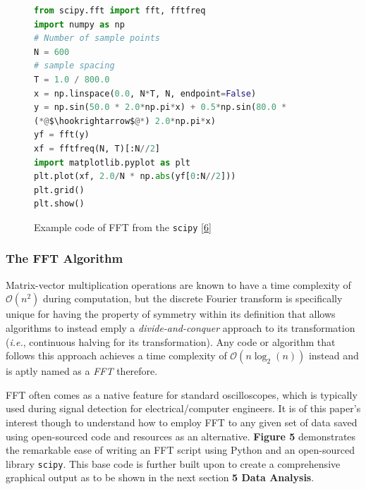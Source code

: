 \documentclass[12pt]{article}
\begin{document}
\begin{multicols}{2}
\begin{figure}[H]
    \begin{tcolorbox}[ %
        breakable, size=fbox, boxrule=1pt, pad at break*=1mm,colback=cellbackground, colframe=cellborder
    ]
        \begin{lstlisting}[language=Python] 
from scipy.fft import fft, fftfreq
import numpy as np
# Number of sample points
N = 600
# sample spacing
T = 1.0 / 800.0
x = np.linspace(0.0, N*T, N, endpoint=False)
y = np.sin(50.0 * 2.0*np.pi*x) + 0.5*np.sin(80.0 * 
(*@$\hookrightarrow$@*) 2.0*np.pi*x)
yf = fft(y)
xf = fftfreq(N, T)[:N//2]
import matplotlib.pyplot as plt
plt.plot(xf, 2.0/N * np.abs(yf[0:N//2]))
plt.grid()
plt.show()
        \end{lstlisting} %
    \end{tcolorbox}
    \caption{Example code of FFT from the \texttt{scipy} [\hyperref[sec:6]{6}]}
\end{figure}

\subsubsection{The FFT Algorithm}
Matrix-vector multiplication operations are known to have a time complexity of $\mathcal{O}(n^2)$ during computation,
but the discrete Fourier transform is specifically unique for having the property of symmetry within its definition that allows
algorithms to instead emply a \textit{divide-and-conquer} approach to its transformation (\textit{i.e.}, continuous halving for its transformation).
Any code or algorithm that follows this approach achieves a time complexity of $\mathcal{O}(n\log_2(n))$ instead and is aptly named as a \textit{FFT} therefore.

FFT often comes as a native feature for standard oscilloscopes, which is typically used during signal detection for electrical/computer engineers.
It is of this paper's interest though to understand how to employ FFT to any given set of data saved using open-sourced code and resources as an alternative. 
\textbf{Figure 5} demonstrates the remarkable ease of writing an FFT script using Python and an open-sourced library \texttt{scipy}.
This base code is further built upon to create a comprehensive graphical output as to be shown in the next section \textbf{5 Data Analysis}.



\end{multicols}
\end{document}
